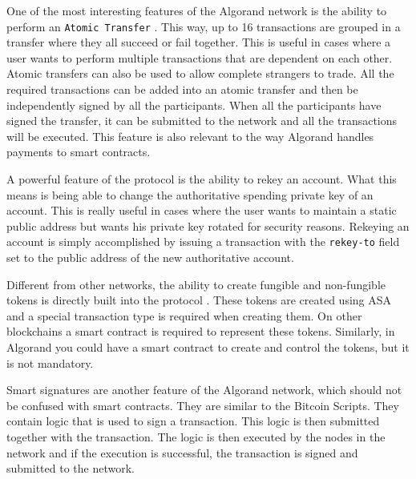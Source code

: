 One of the most interesting features of the Algorand network is the ability to perform an \texttt{Atomic Transfer} \cite{noauthor_atomic_nodate}. This way, up to 16 transactions are grouped in a transfer where they all succeed or fail together. This is useful in cases where a user wants to perform multiple transactions that are dependent on each other. Atomic transfers can also be used to allow complete strangers to trade. All the required transactions can be added into an atomic transfer and then be independently signed by all the participants. When all the participants have signed the transfer, it can be submitted to the network and all the transactions will be executed. This feature is also relevant to the way Algorand handles payments to smart contracts.

A powerful feature of the protocol is the ability to rekey an account. What this means is being able to change the authoritative spending private key of an account. This is really useful in cases where the user wants to maintain a static public address but wants his private key rotated for security reasons. Rekeying an account is simply accomplished by issuing a transaction with the \texttt{rekey-to} field set to the public address of the new authoritative account.

Different from other networks, the ability to create fungible and non-fungible tokens is directly built into the protocol \cite{noauthor_algorand_nodate-4}. These tokens are created using \ac{ASA} and a special transaction type is required when creating them. On other blockchains a smart contract is required to represent these tokens. Similarly, in Algorand you could have a smart contract to create and control the tokens, but it is not mandatory.

Smart signatures are another feature of the Algorand network, which should not be confused with smart contracts. They are similar to the Bitcoin Scripts. They contain logic that is used to sign a transaction. This logic is then submitted together with the transaction. The logic is then executed by the nodes in the network and if the execution is successful, the transaction is signed and submitted to the network.

